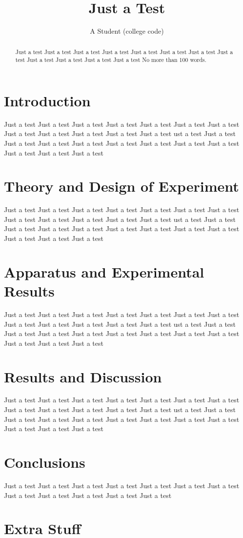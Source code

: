 \documentclass{IIBproject}
\begin{document}
\author{A Student (college code)}
\title{Just a Test}
\maketitle
\thispagestyle{empty}

\begin{abstract}
Just a test Just a test Just a test Just a test Just a test Just a test 
Just a test Just a test Just a test Just a test Just a test Just a test 
No more than 100 words.
\end{abstract}
\pagestyle{plain}
\tableofcontents
\newpage

\section{Introduction}
Just a test Just a test Just a test Just a test Just a test Just a test 
Just a test Just a test Just a test Just a test Just a test Just a test 
ust a test Just a test Just a test Just a test Just a test Just a test 
Just a test Just a test Just a test Just a test Just a test Just a test 

\section{Theory and Design of Experiment}
Just a test Just a test Just a test Just a test Just a test Just a test 
Just a test Just a test Just a test Just a test Just a test Just a test 
ust a test Just a test Just a test Just a test Just a test Just a test 
Just a test Just a test Just a test Just a test Just a test Just a test 

\section{Apparatus and Experimental Results}
Just a test Just a test Just a test Just a test Just a test Just a test 
Just a test Just a test Just a test Just a test Just a test Just a test 
ust a test Just a test Just a test Just a test Just a test Just a test 
Just a test Just a test Just a test Just a test Just a test Just a test 

\section{Results and Discussion}
Just a test Just a test Just a test Just a test Just a test Just a test 
Just a test Just a test Just a test Just a test Just a test Just a test 
ust a test Just a test Just a test Just a test Just a test Just a test 
Just a test Just a test Just a test Just a test Just a test Just a test 

\section{Conclusions}
Just a test Just a test Just a test Just a test Just a test Just a test 
Just a test Just a test Just a test Just a test Just a test Just a test 



\appendix

\section{Extra Stuff}
\end{document}
